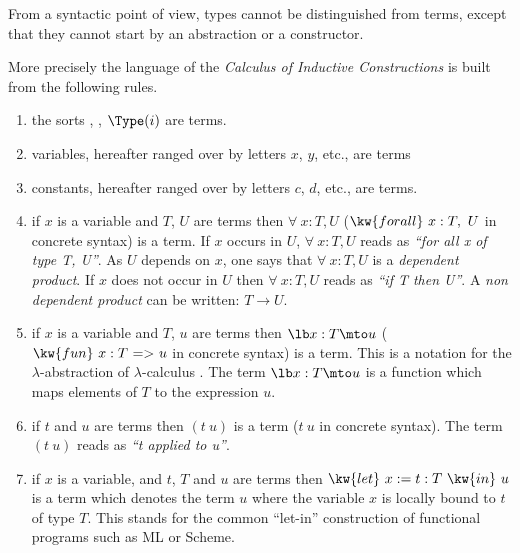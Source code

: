 From a syntactic point of view, types cannot be distinguished from terms,
except that they cannot start by an abstraction or a constructor.

More precisely the language of the {\em Calculus of Inductive
  Constructions} is built from the following rules.

\begin{enumerate}
\item the sorts {\Set}, {\Prop}, ${\Type(i)}$ are terms.
\item variables, hereafter ranged over by letters $x$, $y$, etc., are terms
\item constants, hereafter ranged over by letters $c$, $d$, etc.,  are terms.
\item{} if $x$ is a variable and $T$, $U$ are terms then $\forall~x:T,U$
  ($\kw{forall}~x:T,~U$ in \Coq{} concrete syntax) is a term. If $x$
  occurs in $U$, $\forall~x:T,U$ reads as {\it ``for all x of type T,
    U''}. As $U$ depends on $x$, one says that $\forall~x:T,U$ is a
  {\em dependent product}. If $x$ does not occur in $U$ then
  $\forall~x:T,U$ reads as {\it ``if T then U''}. A {\em non dependent
  product} can be written: $T \rightarrow U$.
\item if $x$ is a variable and $T$, $u$ are terms then $\lb x:T \mto u$
  ($\kw{fun}~x:T~ {\tt =>}~ u$ in \Coq{} concrete syntax) is a term. This is a
  notation for the $\lambda$-abstraction of
  $\lambda$-calculus
  \cite{Bar81}. The term $\lb x:T \mto u$ is a function which maps
  elements of $T$ to the expression $u$.
\item if $t$ and $u$ are terms then $(t\ u)$ is a term  
 ($t~u$ in \Coq{} concrete syntax).  The term $(t\ 
  u)$ reads as {\it ``t applied to u''}.
\item if $x$ is a variable, and $t$, $T$ and $u$ are terms then
  $\kw{let}~x:=t:T~\kw{in}~u$ is a
  term which denotes the term $u$ where the variable $x$ is locally
  bound to $t$ of type $T$. This stands for the common ``let-in''
  construction of functional programs such as ML or Scheme.
\end{enumerate}

